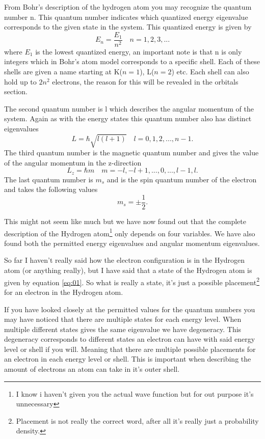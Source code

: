 \documentclass[jmp, amsmath, amssymb, reprint]{article}
\numberwithin{equation}{section}
\newcommand{\lp}{\left(}
\newcommand{\rp}{\right)}
\begin{document}
\begin{multicols}{2}
From Bohr's description of the hydrogen atom you may recognize the quantum number n. This quantum number indicates which quantized energy eigenvalue corresponds to the given state in the system. This quantized energy is given by
\begin{equation}
E_n = \frac{E_1}{n^2}\quad n=1,2,3,...
\end{equation}
where \(E_1\) is the lowest quantized energy, an important note is that n is only integers which in Bohr's atom model corresponds to a specific shell. Each of these shells are given a name starting at K(\(n=1\)), L(\(n=2\)) etc. Each shell can also hold up to \(2n^2\) electrons, the reason for this will be revealed in the orbitals section.

The second quantum number is l which describes the angular momentum of the system. Again as with the energy states this quantum number also has distinct eigenvalues
\begin{equation}
L = \hbar\sqrt{l\lp l+1\rp} \quad l=0, 1, 2,..., n-1.
\end{equation}
The third quantum number is the magnetic quantum number and gives the value of the angular momentum in the z-direction
\begin{equation}
L_z = \hbar m \quad m=-l, -l+1, ..., 0, ...,l-1, l.
\end{equation}
The last quantum number is $m_s$ and is the spin quantum number of the electron and takes the following values
\begin{equation}
m_s=\pm\frac{1}{2}.
\end{equation}

This might not seem like much but we have now found out that the complete description of the Hydrogen atom\footnote{I know i haven't given you the actual wave function but for out purpose it's unnecessary} only depends on four variables. We have also found both the permitted energy eigenvalues and angular momentum eigenvalues.

So far I haven't really said how the electron configuration is in the Hydrogen atom (or anything really), but I have said that a state of the Hydrogen atom is given by equation \ref{eq:01}. So what is really a state, it's just a possible placement\footnote{Placement is not really the correct word, after all it's really just a probability density.} for an electron in the Hydrogen atom. 

If you have looked closely at the permitted values for the quantum numbers you may have noticed that there are multiple states for each energy level. When multiple different states gives the same eigenvalue we have degeneracy. This degeneracy corresponds to different states an electron can have with said energy level or shell if you will. Meaning that there are multiple possible placements for an electron in each energy level or shell. This is important when describing the amount of electrons an atom can take in it's outer shell.


\end{multicols}
\end{document}
